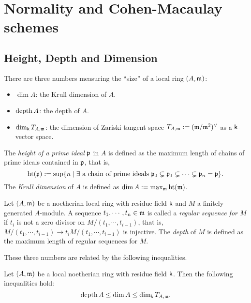 \section{Normality and Cohen-Macaulay schemes}

\subsection{Height, Depth and Dimension}

    There are three numbers measuring the ``size'' of a local ring $(A,\mathfrak{m})$:
    \begin{itemize}
        \item $\dim A$: the Krull dimension of $A$.
        \item $\operatorname{depth} A$: the depth of $A$.
        \item $\dim_{\mathsf{k}} T_{A,\mathfrak{m}}$: the dimension of Zariski tangent space $T_{A,\mathfrak{m}} := (\mathfrak{m}/\mathfrak{m}^2)^\lor$ as a $\mathsf{k}$-vector space.
    \end{itemize}

    \begin{definition}
        The \textit{height of a prime ideal} $\mathfrak{p}$ in $A$ is defined as the maximum length of chains of prime ideals contained in $\mathfrak{p}$, that is, 
        \[ \operatorname{ht}(\mathfrak{p}) := \sup\{ n \mid \exists \text{ a chain of prime ideals } \mathfrak{p}_0 \subsetneq \mathfrak{p}_1 \subsetneq \cdots \subsetneq \mathfrak{p}_n = \mathfrak{p}\}. \] 
        The \textit{Krull dimension} of $A$ is defined as $\dim A := \max_{\mathfrak{m}}\operatorname{ht}(\mathfrak{m})$.
    \end{definition}

    \begin{definition}
        Let $(A,\mathfrak{m})$ be a noetherian local ring with residue field $\mathsf{k}$ and $M$ a finitely generated $A$-module. 
        A sequence $t_1,\cdots,t_n\in \mathfrak{m}$ is called a \textit{regular sequence for $M$} if $t_i$ is not a zero divisor on $M/(t_1,\cdots,t_{i-1})$, that is, $M/(t_1,\cdots,t_{i-1}) \to t_iM/(t_1,\cdots,t_{i-1})$ is injective.
        The \textit{depth} of $M$ is defined as the maximum length of regular sequences for $M$.
    \end{definition}

    These three numbers are related by the following inequalities.
    \begin{proposition}
        Let $(A,\mathfrak{m})$ be a local noetherian ring with residue field $\mathsf{k}$.
        Then the following inequalities hold:
        \[ \operatorname{depth} A \leq \dim A \leq \dim_{\mathsf{k}} T_{A,\mathfrak{m}}. \]
    \end{proposition}

